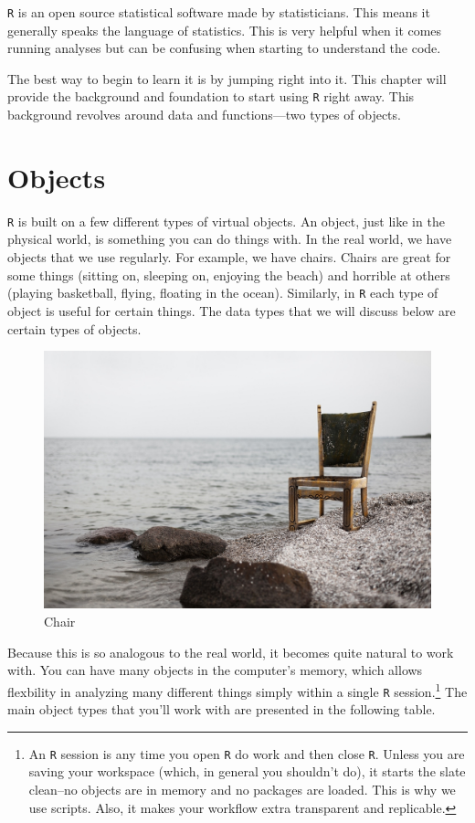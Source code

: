 \documentclass[]{tufte-book}
\theoremstyle{definition}
\theoremstyle{definition}
\theoremstyle{remark}
\begin{document}
\texttt{R} is an open source statistical software made by statisticians.
This means it generally speaks the language of statistics. This is very
helpful when it comes running analyses but can be confusing when
starting to understand the code.

The best way to begin to learn it is by jumping right into it. This
chapter will provide the background and foundation to start using
\texttt{R} right away. This background revolves around data and
functions---two types of objects.

\section*{Objects}\label{objects}

\texttt{R} is built on a few different types of virtual objects. An
object, just like in the physical world, is something you can do things
with. In the real world, we have objects that we use regularly. For
example, we have chairs. Chairs are great for some things (sitting on,
sleeping on, enjoying the beach) and horrible at others (playing
basketball, flying, floating in the ocean). Similarly, in \texttt{R}
each type of object is useful for certain things. The data types that we
will discuss below are certain types of objects.

\begin{figure}
\centering
\includegraphics{chair.jpg}
\caption{Chair}
\end{figure}

Because this is so analogous to the real world, it becomes quite natural
to work with. You can have many objects in the computer's memory, which
allows flexbility in analyzing many different things simply within a
single \texttt{R} session.\footnote{An \texttt{R} session is any time
  you open \texttt{R} do work and then close \texttt{R}. Unless you are
  saving your workspace (which, in general you shouldn't do), it starts
  the slate clean--no objects are in memory and no packages are loaded.
  This is why we use scripts. Also, it makes your workflow extra
  transparent and replicable.} The main object types that you'll work
with are presented in the following table.
\end{document}
